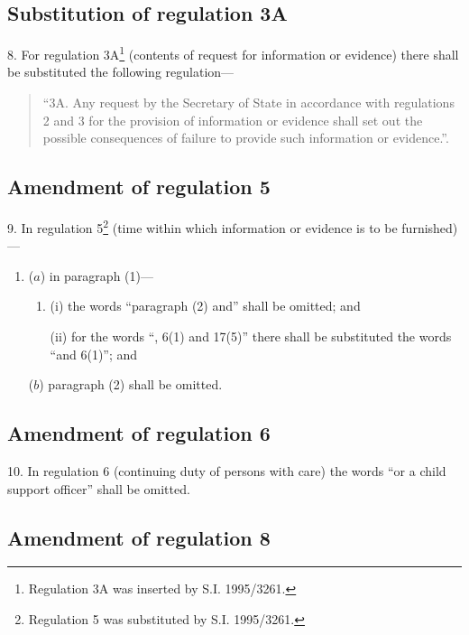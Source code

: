 \documentclass[12pt,a4paper]{article}
\begin{document}
\subsection[8. Substitution of regulation 3A]{Substitution of regulation 3A}

8.  For regulation 3A\footnote{\frenchspacing Regulation 3A was inserted by S.I. 1995/3261.} (contents of request for information or evidence) there shall be substituted the following regulation—
\begin{quotation}
“3A.  Any request by the Secretary of State in accordance with regulations 2 and 3 for the provision of information or evidence shall set out the possible consequences of failure to provide such information or evidence.”.
\end{quotation}

\subsection[9. Amendment of regulation 5]{Amendment of regulation 5}

9.  In regulation 5\footnote{\frenchspacing Regulation 5 was substituted by S.I. 1995/3261.} (time within which information or evidence is to be furnished)—
\begin{enumerate}\item[]
($a$) in paragraph (1)—
\begin{enumerate}\item[]
(i) the words “paragraph (2) and” shall be omitted; and

(ii) for the words “, 6(1) and 17(5)” there shall be substituted the words “and 6(1)”; and
\end{enumerate}

($b$) paragraph (2) shall be omitted.
\end{enumerate}

\subsection[10. Amendment of regulation 6]{Amendment of regulation 6}

10.  In regulation 6 (continuing duty of persons with care) the words “or a child support officer” shall be omitted.

\subsection[11. Amendment of regulation 8]{Amendment of regulation 8}
\end{document}
